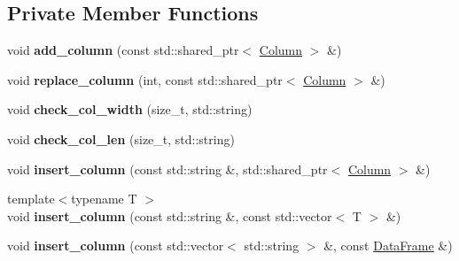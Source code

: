 \subsection*{Private Member Functions}
\begin{DoxyCompactItemize}
\item 
\mbox{\label{classDataFrame_1_1DataFrameProxy_a86f0a67b671260df875dd32d587d02c0}} 
void {\bfseries add\+\_\+column} (const std\+::shared\+\_\+ptr$<$ \hyperlink{classColumn}{Column} $>$ \&)
\item 
\mbox{\label{classDataFrame_1_1DataFrameProxy_a0706f91d14181e989b3d41836a8b5cc6}} 
void {\bfseries replace\+\_\+column} (int, const std\+::shared\+\_\+ptr$<$ \hyperlink{classColumn}{Column} $>$ \&)
\item 
\mbox{\label{classDataFrame_1_1DataFrameProxy_a93ea7598d298b57ba7c3226e72dfd42d}} 
void {\bfseries check\+\_\+col\+\_\+width} (size\+\_\+t, std\+::string)
\item 
\mbox{\label{classDataFrame_1_1DataFrameProxy_ae5a106a7251245dd7d0320172a775d43}} 
void {\bfseries check\+\_\+col\+\_\+len} (size\+\_\+t, std\+::string)
\item 
\mbox{\label{classDataFrame_1_1DataFrameProxy_a8cf3701f97648ea7762f524496c21e6b}} 
void {\bfseries insert\+\_\+column} (const std\+::string \&, std\+::shared\+\_\+ptr$<$ \hyperlink{classColumn}{Column} $>$ \&)
\item 
\mbox{\label{classDataFrame_1_1DataFrameProxy_accc578b4911e2b9744616dc3623e4b02}} 
{\footnotesize template$<$typename T $>$ }\\void {\bfseries insert\+\_\+column} (const std\+::string \&, const std\+::vector$<$ T $>$ \&)
\item 
\mbox{\label{classDataFrame_1_1DataFrameProxy_a3af6f64b9454ff50735b0bdbb6f6398b}} 
void {\bfseries insert\+\_\+column} (const std\+::vector$<$ std\+::string $>$ \&, const \hyperlink{classDataFrame}{Data\+Frame} \&)
\end{DoxyCompactItemize}
